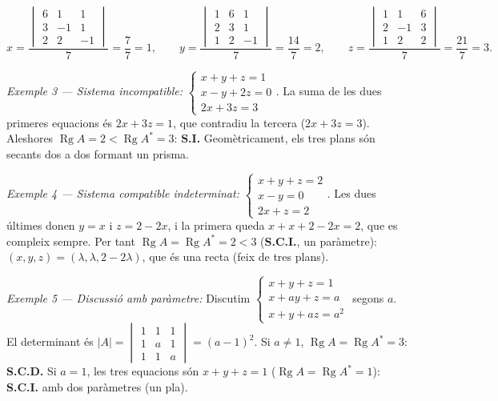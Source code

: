 \begin{equation*}
x=\frac{\begin{vmatrix}6&1&1\\3&-1&1\\2&2&-1\end{vmatrix}}{7}=\frac77=1,\qquad y=\frac{\begin{vmatrix}1&6&1\\2&3&1\\1&2&-1\end{vmatrix}}{7}=\frac{14}{7}=2,\qquad z=\frac{\begin{vmatrix}1&1&6\\2&-1&3\\1&2&2\end{vmatrix}}{7}=\frac{21}{7}=3.
\end{equation*}

\emph{Exemple 3 --- Sistema incompatible:} $\begin{cases}x+y+z=1\\x-y+2z=0\\2x+3z=3\end{cases}$. La suma de les dues primeres equacions és $2x+3z=1$, que contradiu la tercera ($2x+3z=3$). Aleshores $\operatorname{Rg}A=2<\operatorname{Rg}A^{*}=3$: \textbf{S.I.} Geomètricament, els tres plans són secants dos a dos formant un prisma.

\emph{Exemple 4 --- Sistema compatible indeterminat:} $\begin{cases}x+y+z=2\\x-y=0\\2x+z=2\end{cases}$. Les dues últimes donen $y=x$ i $z=2-2x$, i la primera queda $x+x+2-2x=2$, que es compleix sempre. Per tant $\operatorname{Rg}A=\operatorname{Rg}A^{*}=2<3$ (\textbf{S.C.I.}, un paràmetre): $(x,y,z)=(\lambda,\lambda,2-2\lambda)$, que és una recta (feix de tres plans).

\emph{Exemple 5 --- Discussió amb paràmetre:} Discutim $\begin{cases}x+y+z=1\\x+ay+z=a\\x+y+az=a^{2}\end{cases}$ segons $a$. El determinant és $|A|=\begin{vmatrix}1&1&1\\1&a&1\\1&1&a\end{vmatrix}=(a-1)^{2}$. Si $a\neq1$, $\operatorname{Rg}A=\operatorname{Rg}A^{*}=3$: \textbf{S.C.D.} Si $a=1$, les tres equacions són $x+y+z=1$ ($\operatorname{Rg}A=\operatorname{Rg}A^{*}=1$): \textbf{S.C.I.} amb dos paràmetres (un pla).

